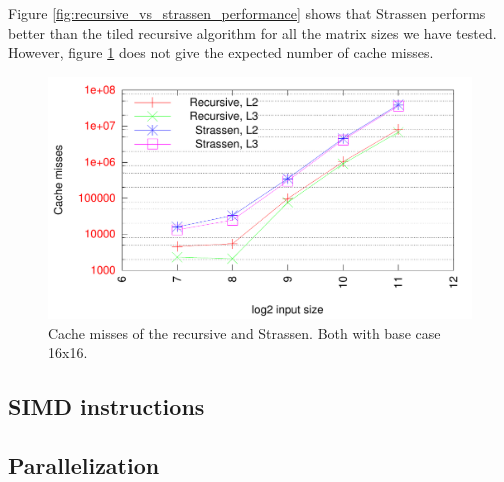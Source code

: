 Figure \ref{fig:recursive_vs_strassen_performance} shows that Strassen performs better than the tiled recursive algorithm for all the matrix sizes we have tested. However, figure \ref{fig:recursive_vs_strassen_cache} does not give the expected number of cache misses. 

\begin{figure}[h!]
  \centering
  \includegraphics[width=\textwidth]{"../project2/gnuplots/recursive_vs_strassen_cache"}
  \caption{Cache misses of the recursive and Strassen. Both with base case 16x16.}
  \label{fig:recursive_vs_strassen_cache}
\end{figure}





\subsection{SIMD instructions}


\subsection{Parallelization}


